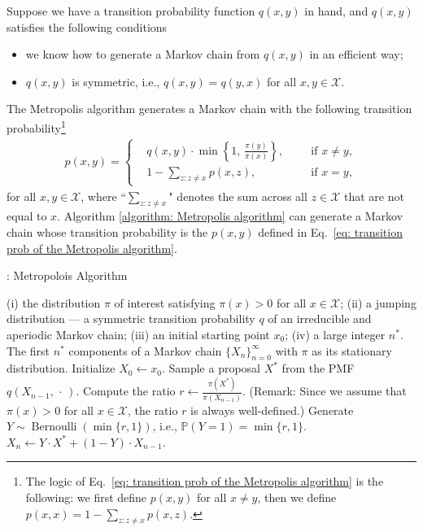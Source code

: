 \documentclass[11pt,letterpaper, leqno]{article}
\numberwithin{equation}{section}
\numberwithin{theorem}{section}
\numberwithin{lemma}{section}
\numberwithin{corollary}{section}
\numberwithin{definition}{section}
\numberwithin{proposition}{section}
\numberwithin{remark}{section}
\numberwithin{example}{section}
\begin{document}
Suppose we have a transition probability function $q(x,y)$ in hand, and $q(x,y)$ satisfies the following conditions
\begin{itemize}
    \item we know how to generate a Markov chain from $q(x,y)$ in an efficient way;
    \item $q(x,y)$ is symmetric, i.e., $q(x,y)=q(y,x)$ for all $x,y\in\mathcal{X}$.
\end{itemize}
The Metropolis algorithm generates a Markov chain with the following transition probability\footnote{The logic of Eq.~\eqref{eq: transition prob of the Metropolis algorithm} is the following: we first define $p(x,y)$ for all $x\ne y$, then we define $p(x,x)=1-\sum_{z:z\ne x} p(x,z)$.}
\begin{align}\label{eq: transition prob of the Metropolis algorithm}
    p(x,y) = \left\{
    \begin{aligned}
    & q(x,y)\cdot\min\left\{1, \, \frac{\pi(y)}{\pi(x)}\right\},\ \ &&\mbox{ if }x\ne y, \\
    & 1-\sum_{z:z\ne x} p(x,z),\ \ &&\mbox{ if }x=y,
    \end{aligned}
    \right.
\end{align}
for all $x,y\in\mathcal{X}$, where ``$\sum_{z:z\ne x}$" denotes the sum across all $z\in\mathcal{X}$ that are not equal to $x$. Algorithm \ref{algorithm: Metropolis algorithm} can generate a Markov chain whose transition probability is the $p(x,y)$ defined in Eq.~\eqref{eq: transition prob of the Metropolis algorithm}.
\begin{algorithm}
\caption{: Metropolois Algorithm}\label{algorithm: Metropolis algorithm}
\begin{algorithmic}[1]
    \INPUT (i) the distribution $\pi$ of interest satisfying $\pi(x)>0$ for all $x\in\mathcal{X}$; (ii) a jumping distribution --- a symmetric transition probability $q$ of an irreducible and aperiodic Markov chain; (iii) an initial starting point $x_0$; (iv) a large integer $n^*$.
    \OUTPUT The first $n^*$ components of a Markov chain $\{X_n\}_{n=0}^\infty$ with $\pi$ as its stationary distribution.
    \STATE Initialize $X_0 \leftarrow x_0$.
    \STATE Sample a proposal $X^*$ from the PMF $q(X_{n-1},\, \cdot\,)$.
    \STATE Compute the ratio $r\leftarrow\frac{\pi(X^*)}{\pi(X_{n-1})}$. (Remark: Since we assume that $\pi(x)>0$ for all $x\in\mathcal{X}$, the ratio $r$ is always well-defined.)
    \STATE Generate $Y\sim \operatorname{Bernoulli}(\min\{r,1\})$, i.e., $\mathbb{P}(Y=1)=\min\{r,1\}$.
    \STATE $X_n \leftarrow Y\cdot X^* + (1-Y)\cdot X_{n-1}$.
    \ENDFOR
\end{algorithmic}
\end{algorithm}
\end{document}
